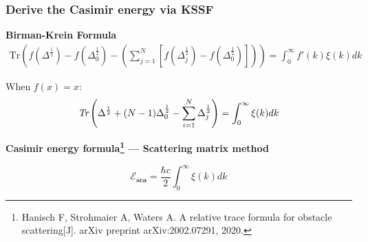\documentclass[dvipsnames,10pt]{beamer}
\begin{document}
\begin{frame}
    \frametitle{Derive the Casimir energy via KSSF}
    \vspace{0.3cm}
    \begin{tcolorbox}
    \textbf{Birman-Krein Formula}
    \begin{align*}
    \text{Tr}\left(f(\Delta^{\frac{1}{2}}) - f(\Delta_{0}^{\frac{1}{2}}) - \left(\sum_{j = 1}^{N}[f(\Delta_{j}^{\frac{1}{2}}) - f(\Delta_{0}^{\frac{1}{2}})]\right)\right)  = \int_{0}^{\infty}f'(k)\xi(k)dk
\end{align*}
\end{tcolorbox}
When $f(x) = x$:
\begin{align*}
        \emph{\text{Tr}}\left(\Delta^{\frac{1}{2}} + (N - 1)\Delta_{0}^{\frac{1}{2}} - \sum_{i = 1}^{N}\Delta_{j}^{\frac{1}{2}}\right)  = 
        \int_{0}^{\infty}\xi(k)dk
    \end{align*}
\begin{tcolorbox}
    \textbf{Casimir energy formula\footnote{Hanisch F, Strohmaier A, Waters A. A relative trace formula for obstacle scattering[J]. arXiv preprint arXiv:2002.07291, 2020.} ---
    Scattering matrix method}
    
    $$\mathcal{E}_{\textbf{sca}} = \frac{\hbar c}{2}\int_{0}^{\infty}\xi(k)dk$$
\end{tcolorbox}
\end{frame}
\end{document}

